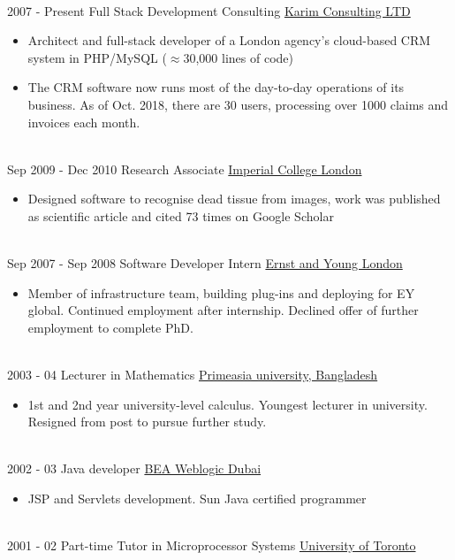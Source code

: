 \documentclass[letterpaper]{twentysecondcv} %
\begin{document}
\begin{twenty}
{\begin{itemize}
        \end{itemize}}
        \\
	\twentyitem
    	{2007 - }
		{Present}
        {Full Stack Development Consulting}
        {\href{http://www.desilvatutors.co.uk/}{Karim Consulting LTD}}
        {}
        {
        {
    \begin{itemize}
\item Architect and full-stack developer of a London agency's cloud-based CRM system in PHP/MySQL ($\approx$30,000 lines of code) 
		\item The CRM software now runs most of the day-to-day operations of its business. As of Oct. 2018, there are 30 users, processing over 1000 claims and invoices each month. 
    \end{itemize}}
        }
    \\   
    \twentyitem
   		{Sep 2009 -}
		{Dec 2010}
        {Research Associate}
        {\href{http://www.imperial.ac.uk}{Imperial College London}}
        {}
        {
        {\begin{itemize}
        \item Designed software to recognise dead tissue from images, work was published as scientific article and cited 73 times on Google Scholar
    \end{itemize}}
        }
     \\
     \twentyitem
   		{Sep 2007 -}
		{Sep 2008}
        {Software Developer Intern}
        {\href{http://www.ey.com/}{Ernst and Young London}}
        {}
        {
        \begin{itemize}
        \item Member of infrastructure team, building plug-ins and deploying for EY global. Continued employment after internship. Declined offer of further employment to complete PhD.
        \end{itemize}
     	}   
    	\\ 
      \twentyitem
   		{2003 - 04}
		{}
        {Lecturer in Mathematics}
        {\href{http://www.primeasia.edu.bd/}{Primeasia university, Bangladesh}}
        {
        \begin{itemize}
        \item 1st and 2nd year university-level calculus. Youngest lecturer in university. Resigned from post to pursue further study. 
 
        \end{itemize}
        }{}
	\\ 
      \twentyitem
   		{2002 - 03}
		{}
        {Java developer}
        {\href{https://en.wikipedia.org/wiki/BEA_Systems}{BEA Weblogic Dubai}}
		{
		\begin{itemize}
		\item JSP and Servlets development. Sun Java certified programmer
		\end{itemize}		
		}{}
	\\ 
      \twentyitem
   		{2001 - 02}
		{}
        {Part-time Tutor in Microprocessor Systems}
        {\href{https://www.utoronto.ca}{University of Toronto}}
		{}{}
        
        
\end{twenty}
\end{document}

